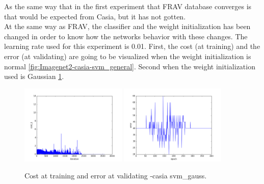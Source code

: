 As the same way that in the first experiment that FRAV database converges is that would be expected from Casia, but it has not gotten.\\

\clearpage
At the same way as FRAV, the classifier and the weight initialization has been changed in order to know how the networks behavior with these changes. The learning rate used for this experiment is 0.01. First, the cost (at training) and the error (at validating) are going to be visualized when the weight initialization is normal \ref{fig:Imagenet2-casia-svm_general}. Second when the weight initialization used is Gaussian \ref{fig:Imagenet2-casia-svm_gauss}.\\


\begin{figure}[htb]
\centering
\includegraphics[width=0.45\textwidth]{images/FRAv_casia_ImageNet/Imagenet2/casia/svm_gauss/cost.png}
\includegraphics[width=0.45\textwidth]{images/FRAv_casia_ImageNet/Imagenet2/casia/svm_gauss/error.png}
\caption{Cost at training and error at validating -casia svm\_gauss.} \label{fig:Imagenet2-casia-svm_gauss}
\end{figure}


